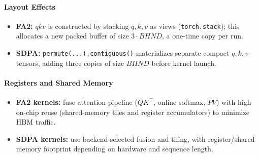 \documentclass[11pt]{article}
\begin{document}
\paragraph{Layout Effects}
\begin{itemize}
\item \textbf{FA2:} $qkv$ is constructed by stacking $q,k,v$ as views (\texttt{torch.stack}); this allocates a new packed buffer of size $3 \cdot BHND$, a one-time copy per run.
\item \textbf{SDPA:} \texttt{permute(...).contiguous()} materializes separate compact $q,k,v$ tensors, adding three copies of size $BHND$ before kernel launch.
\end{itemize}

\paragraph{Registers and Shared Memory}
\begin{itemize}
\item \textbf{FA2 kernels:} fuse attention pipeline ($QK^{\top}$, online softmax, $PV$) with high on-chip reuse (shared-memory tiles and register accumulators) to minimize HBM traffic.
\item \textbf{SDPA kernels:} use backend-selected fusion and tiling, with register/shared memory footprint depending on hardware and sequence length.
\end{itemize}
\end{document}
